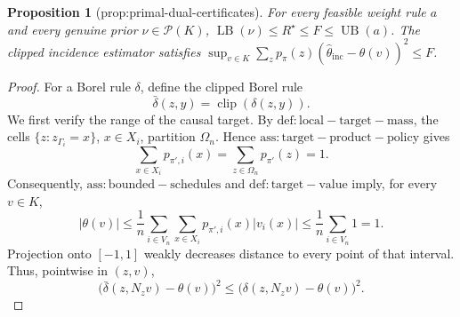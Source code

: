 \documentclass{article}
\newtheorem{proposition}{Proposition}
\begin{document}
\begin{proposition}[prop:primal-dual-certificates]\label{prop:primal-dual-certificates}
For every feasible weight rule \(a\) and every genuine prior \(\nu\in\mathcal P(K)\), \(\operatorname{LB}(\nu)\le R^{\star}\le F\le\operatorname{UB}(a)\). The clipped incidence estimator satisfies \(\sup_{v\in K}\sum_zp_{\pi}(z)(\widehat\theta_{\mathrm{inc}}-\theta(v))^2\le F\).
\end{proposition}
\begin{proof}
For a Borel rule \(\delta\), define the clipped Borel rule
\[
 \bar\delta(z,y)=\operatorname{clip}(\delta(z,y)).
\]
We first verify the range of the causal target.  By \(\mathrm{def:local-target-mass}\), the cells \(\{z:z_{\Gamma_i}=x\}\), \(x\in X_i\), partition \(\Omega_n\).  Hence \(\mathrm{ass:target-product-policy}\) gives
\[
 \sum_{x\in X_i}p_{\pi',i}(x)
 =\sum_{z\in\Omega_n}p_{\pi'}(z)=1.
\]
Consequently, \(\mathrm{ass:bounded-schedules}\) and \(\mathrm{def:target-value}\) imply, for every \(v\in K\),
\[
 \lvert\theta(v)\rvert
 \le \frac1n\sum_{i\in V_n}\sum_{x\in X_i}
 p_{\pi',i}(x)\lvert v_i(x)\rvert
 \le \frac1n\sum_{i\in V_n}1=1.
\]
Projection onto \([-1,1]\) weakly decreases distance to every point of that interval.  Thus, pointwise in \((z,v)\),
\[
 \bigl(\bar\delta(z,N_zv)-\theta(v)\bigr)^2
 \le
 \bigl(\delta(z,N_zv)-\theta(v)\bigr)^2.                                      \tag{1}
\]


\end{proof}
\end{document}
